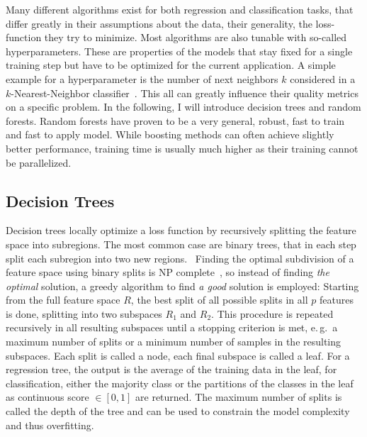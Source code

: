 Many different algorithms exist for both regression and classification tasks,
that differ greatly in their assumptions about the data, their generality, 
the loss-function they try to minimize.
Most algorithms are also tunable with so-called hyperparameters.
These are properties of the models that stay fixed for a single training
step but have to be optimized for the current application.
A simple example for a hyperparameter is the number of next neighbors $k$
considered in a $k$-Nearest-Neighbor classifier~\cite[chapter 9.1]{hasties}.
This all can greatly influence their quality metrics on a specific problem. 
In the following, I will introduce decision trees and random forests.
Random forests have proven to be a very general, robust, fast to train and fast to apply
model.
While boosting methods can often achieve slightly better performance, 
training time is usually much higher as their training cannot be parallelized.

\subsection{Decision Trees}

Decision trees locally optimize a loss function by recursively
splitting the feature space into subregions.
The most common case are binary trees, that in each step split each subregion
into two new regions.~\cite{cart}
Finding the optimal subdivision of a feature space using binary splits is
NP complete~\cite{trees_np}, so instead of finding \emph{the optimal} solution,
a greedy algorithm to find \emph{a good} solution is employed:
Starting from the full feature space $R$, the best split of all possible splits
in all $p$ features is done, splitting into two subspaces $R_1$ and $R_2$.
This procedure is repeated recursively in all resulting subspaces until a stopping criterion
is met, e.\,g.\ a maximum number of splits or a minimum number of samples in the
resulting subspaces. Each split is called a node, each final subspace is called a leaf.
For a regression tree, the output is the average of the training data in the leaf,
for classification, either the majority class or the partitions of the classes
in the leaf as continuous score ${} \in [0, 1]$ are returned.
The maximum number of splits is called the depth of the tree and can be used
to constrain the model complexity and thus overfitting.

